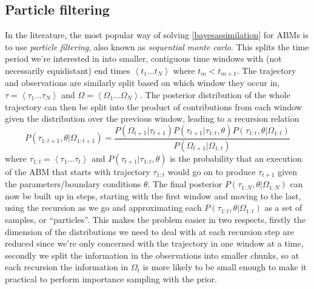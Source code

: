 \documentclass{article}
\begin{document}
\subsection{Particle filtering}
In the literature, the most popular way of solving \eqref{bayesassimilation} for ABMs is to use \textit{particle filtering}, also known as \textit{sequential monte carlo}. This splits the time period we're interested in into smaller, contiguous time windows with (not necessarily equidistant) end times $\left<t_1 \dots t_N\right>$ where $t_m < t_{m+1}$. The trajectory and observations are similarly split based on which window they occur in, $\tau = \left<\tau_1 \dots \tau_N\right>$ and $\Omega = \left<\Omega_1 \dots \Omega_N\right>$. The posterior distribution of the whole trajectory can then be split into the product of contributions from each window given the distribution over the previous window, leading to a recursion relation
\begin{equation}
P\left(\tau_{1:t+1}, \theta | \Omega_{1:t+1}\right)
=
\frac{ P(\Omega_{t+1}|\tau_{t+1})
P(\tau_{t+1}|\tau_{1:t},\theta) P\left(\tau_{1:t},\theta| \Omega_{1:t}\right)
}
{	P(\Omega_{t+1}| \Omega_{1:t}) }
\label{bayesrecursion}
\end{equation}
where $\tau_{1:t} = \left<\tau_1 \dots \tau_t\right>$ and $P(\tau_{t+1}|\tau_{1:t},\theta)$ is the probability that an execution of the ABM that starts with trajectory $\tau_{1:t}$ would go on to produce $\tau_{t+1}$ given the parameters/boundary conditions $\theta$. The final posterior $P(\tau_{1:N},\theta|\Omega_{1:N})$ can now be built up in steps, starting with the first window and moving to the last, using the recursion as we go and approximating each $P(\tau_{1:t}, \theta | \Omega_{1:t})$ as a set of samples, or ``particles''. This makes the problem easier in two respects, firstly the dimension of the distributions we need to deal with at each recursion step are reduced since we're only concerned with the trajectory in one window at a time, secondly we split the information in the observations into smaller chunks, so at each recursion the information in $\Omega_t$ is more likely to be small enough to make it practical to perform importance sampling with the prior.
\end{document}
